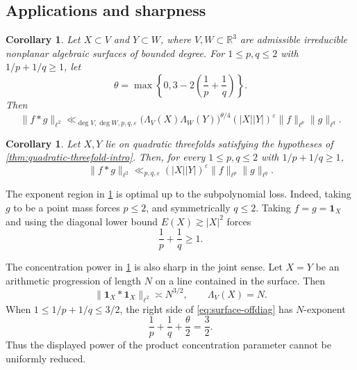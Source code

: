 \documentclass[11pt]{amsart}
\numberwithin{equation}{section}
\newtheorem{corollary}[theorem]{Corollary}
\theoremstyle{definition}
\theoremstyle{remark}
\newcommand{\R}{\mathbb R}
\newcommand{\eps}{\varepsilon}
\newcommand{\1}{\mathbf 1}
\newcommand{\card}[1]{\lvert #1\rvert}
\newcommand{\norm}[2][]{\lVert #2\rVert_{#1}}
\begin{document}
\subsection{Applications and sharpness}
\begin{corollary}\label{cor:surface-offdiag}
Let $X\subset V$ and $Y\subset W$, where $V,W\subset\R^3$ are admissible irreducible nonplanar algebraic surfaces of bounded degree.  For $1\leq p,q\leq2$ with $1/p+1/q\geq1$, let
\[
 \theta=\max\left\{0,3-2\left(\frac1p+\frac1q\right)\right\}.
\]
Then
\begin{equation}\label{eq:surface-offdiag}
 \norm[\ell^2]{f*g}
 \ll_{\deg V,\deg W,p,q,\eps}
 \bigl(\Lambda_V(X)\Lambda_W(Y)\bigr)^{\theta/4}
 (\card X\card Y)^\eps
 \norm[\ell^p]{f}\norm[\ell^q]{g}.
\end{equation}
\end{corollary}

\begin{corollary}\label{cor:threefold-offdiag}
Let $X,Y$ lie on quadratic threefolds satisfying the hypotheses of \cref{thm:quadratic-threefold-intro}.  Then, for every $1\leq p,q\leq2$ with $1/p+1/q\geq1$,
\begin{equation}\label{eq:threefold-offdiag}
 \norm[\ell^2]{f*g}
 \ll_{p,q,\eps}(\card X\card Y)^\eps
 \norm[\ell^p]{f}\norm[\ell^q]{g}.
\end{equation}
\end{corollary}

The exponent region in \cref{cor:threefold-offdiag} is optimal up to the subpolynomial loss.  Indeed, taking $g$ to be a point mass forces $p\leq2$, and symmetrically $q\leq2$.  Taking $f=g=\1_X$ and using the diagonal lower bound $E(X)\gtrsim\card X^2$ forces
\[
 \frac1p+\frac1q\geq1.
\]

The concentration power in \cref{cor:surface-offdiag} is also sharp in the joint sense.  Let $X=Y$ be an arithmetic progression of length $N$ on a line contained in the surface.  Then
\[
 \norm[\ell^2]{\1_X*\1_X}\asymp N^{3/2},
 \qquad
 \Lambda_V(X)=N.
\]
When $1\leq1/p+1/q\leq3/2$, the right side of \eqref{eq:surface-offdiag} has $N$-exponent
\[
 \frac1p+\frac1q+\frac\theta2=\frac32.
\]
Thus the displayed power of the product concentration parameter cannot be uniformly reduced.
\end{document}
